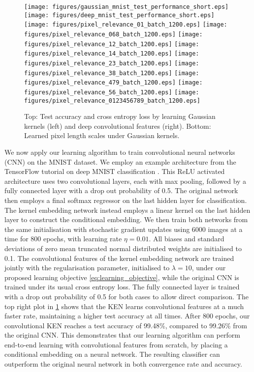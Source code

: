 \documentclass{article}
\begin{document}
		\begin{figure}[t]
			\centering 
			\texttt{[image: figures/gaussian\_mnist\_test\_performance\_short.eps]}
			\texttt{[image: figures/deep\_mnist\_test\_performance\_short.eps]}
			\texttt{[image: figures/pixel\_relevance\_01\_batch\_1200.eps]}
			\texttt{[image: figures/pixel\_relevance\_068\_batch\_1200.eps]}
			\texttt{[image: figures/pixel\_relevance\_12\_batch\_1200.eps]}
			\texttt{[image: figures/pixel\_relevance\_14\_batch\_1200.eps]}
			\texttt{[image: figures/pixel\_relevance\_23\_batch\_1200.eps]}
			\texttt{[image: figures/pixel\_relevance\_38\_batch\_1200.eps]}
			\texttt{[image: figures/pixel\_relevance\_479\_batch\_1200.eps]}
			\texttt{[image: figures/pixel\_relevance\_56\_batch\_1200.eps]}
			\texttt{[image: figures/pixel\_relevance\_0123456789\_batch\_1200.eps]}
			\caption{Top: Test accuracy and cross entropy loss by learning Gaussian kernels (left) and deep convolutional features (right). Bottom: Learned pixel length scales under Gaussian kernels.}
			\label{fig:mnist_experiments}
		\end{figure}
		
		We now apply our learning algorithm to train convolutional neural networks (CNN) on the MNIST dataset. We employ an example architecture from the TensorFlow tutorial on deep MNIST classification \citep{abadi2016tensorflow}. This ReLU activated architecture uses two convolutional layers, each with max pooling, followed by a fully connected layer with a drop out probability of 0.5. The original network then employs a final softmax regressor on the last hidden layer for classification. The kernel embedding network instead employs a linear kernel on the last hidden layer to construct the conditional embedding. We then train both networks from the same initialisation with stochastic gradient updates using 6000 images at a time for 800 epochs, with learning rate $\eta = 0.01$. All biases and standard deviations of zero mean truncated normal distributed weights are initialised to 0.1. The convolutional features of the kernel embedding network are trained jointly with the regularisation parameter, initialised to $\lambda = 10$, under our proposed learning objective \eqref{eq:learning_objective}, while the original CNN is trained under its usual cross entropy loss. The fully connected layer is trained with a drop out probability of 0.5 for both cases to allow direct comparison. The top right plot in \cref{fig:mnist_experiments} shows that the KEN learns convolutional features at a much faster rate, maintaining a higher test accuracy at all times. After 800 epochs, our convolutional KEN reaches a test accuracy of 99.48\%, compared to 99.26\% from the original CNN. This demonstrates that our learning algorithm can perform end-to-end learning with convolutional features from scratch, by placing a conditional embedding on a neural network. The resulting classifier can outperform the original neural network in both convergence rate and accuracy.
	
\end{document}
